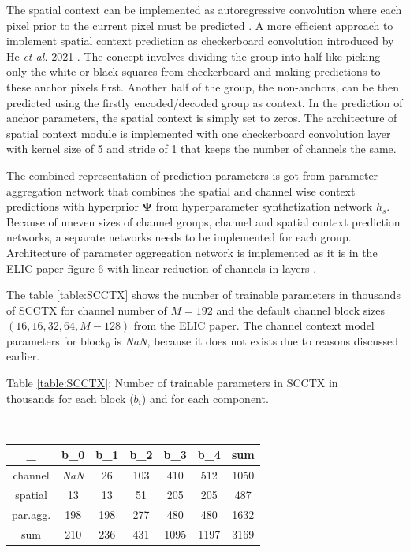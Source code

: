 \documentclass{article}
\begin{document}
The spatial context can be implemented as autoregressive convolution where each pixel prior to the current pixel must be predicted \cite{mbt2018}. A more efficient approach to implement spatial context prediction as checkerboard convolution introduced by He \textit{et al.} 2021 \cite{checkerboard}. The concept involves dividing the group into half like picking only the white or black squares from checkerboard and making predictions to these anchor pixels first. Another half of the group, the non-anchors, can be then predicted using the firstly encoded/decoded group as context. In the prediction of anchor parameters, the spatial context is simply set to zeros. The architecture of spatial context module is implemented with one checkerboard convolution layer with kernel size of 5 and stride of 1 that keeps the number of channels the same. 

The combined representation of prediction parameters is got from parameter aggregation network that combines the spatial and channel wise context predictions with hyperprior $\mathbf{\Psi}$ from hyperparameter synthetization network $h_s$. Because of uneven sizes of channel groups, channel and spatial context prediction networks, a separate networks needs to be implemented for each group. Architecture of parameter aggregation network is implemented as it is in the ELIC paper figure 6 with linear reduction of channels in layers \cite{ELIC}. 

The table \ref{table:SCCTX} shows the number of trainable parameters in thousands of SCCTX for channel number of $M=192$ and the default channel block sizes $(16,16,32,64,M-128)$ from the ELIC paper. The channel context model parameters for block$_0$ is \textit{NaN}, because it does not exists due to reasons discussed earlier. 

\begin{center}
\caption{Table \ref{table:SCCTX}: Number of trainable parameters in SCCTX in\\ thousands for each block ($b_i$) and for each component.}\\
\begin{tabular}{c c c c c c c} 
 \hline
 _ & b_0 & b_1 & b_2 & b_3 & b_4 & sum \\  
 \hline\hline
 channel & \textit{NaN} & 26 & 103 & 410 & 512 & 1050 \\
 \hline
 spatial & 13 & 13 & 51 & 205 & 205 & 487 \\
 \hline
 par.agg. & 198 & 198 & 277 & 480 & 480 & 1632 \\
 \hline
 sum & 210 & 236 & 431 & 1095 & 1197 & 3169 \\
 \hline
\end{tabular}
\label{table:SCCTX}
\end{center}
\end{document}
